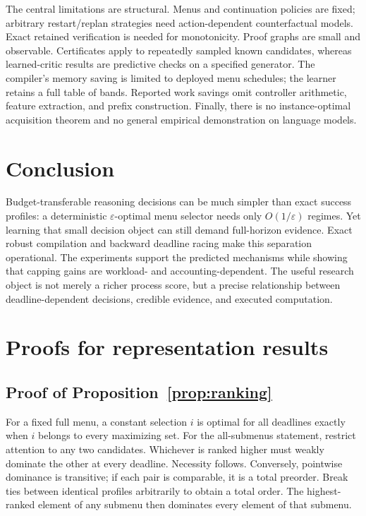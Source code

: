 \documentclass[11pt]{article}
\theoremstyle{definition}\newtheorem{definition}[theorem]{Definition}
\newcommand{\eps}{\varepsilon}
\begin{document}
The central limitations are structural. Menus and continuation policies are fixed; arbitrary restart/replan strategies need action-dependent counterfactual models. Exact retained verification is needed for monotonicity. Proof graphs are small and observable. Certificates apply to repeatedly sampled known candidates, whereas learned-critic results are predictive checks on a specified generator. The compiler's memory saving is limited to deployed menu schedules; the learner retains a full table of bands. Reported work savings omit controller arithmetic, feature extraction, and prefix construction. Finally, there is no instance-optimal acquisition theorem and no general empirical demonstration on language models.

\section{Conclusion}
Budget-transferable reasoning decisions can be much simpler than exact success profiles: a deterministic $\eps$-optimal menu selector needs only $O(1/\eps)$ regimes. Yet learning that small decision object can still demand full-horizon evidence. Exact robust compilation and backward deadline racing make this separation operational. The experiments support the predicted mechanisms while showing that capping gains are workload- and accounting-dependent. The useful research object is not merely a richer process score, but a precise relationship between deadline-dependent decisions, credible evidence, and executed computation.



\clearpage
\appendix
\section{Proofs for representation results}
\subsection{Proof of Proposition~\ref{prop:ranking}}
For a fixed full menu, a constant selection $i$ is optimal for all deadlines exactly when $i$ belongs to every maximizing set. For the all-submenus statement, restrict attention to any two candidates. Whichever is ranked higher must weakly dominate the other at every deadline. Necessity follows. Conversely, pointwise dominance is transitive; if each pair is comparable, it is a total preorder. Break ties between identical profiles arbitrarily to obtain a total order. The highest-ranked element of any submenu then dominates every element of that submenu.
\end{document}

